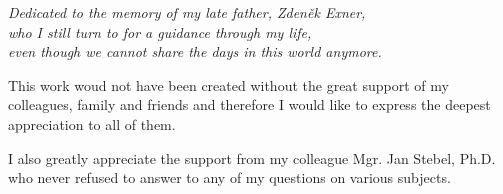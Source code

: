 \documentclass[bibliography=totocnumbered,dvipsnames,FM,Dis,EN]{tulthesis}
\begin{document}


\clearpage


\thispagestyle{empty}
\vspace*{2in}
\begin{center}
\emph{
Dedicated to the memory of my late father, Zden{\v e}k Exner,\\
who I still turn to for a guidance through my life,\\
even though we cannot share the days in this world anymore.
}
\end{center}
\vspace*{\fill}
\clearpage


\begin{acknowledgement}
\thispagestyle{empty}
This work woud not have been created without the great support of my colleagues, family and friends
and therefore I would like to express the deepest appreciation to all of them.

I also greatly appreciate the support from my colleague Mgr. Jan Stebel, Ph.D.
who never refused to answer to any of my questions on various subjects.


% 
% 
% 

\end{acknowledgement}
\end{document}
